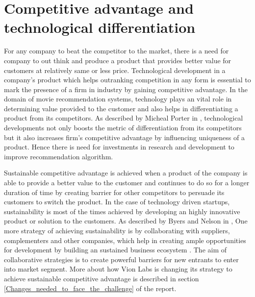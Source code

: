 \section{Competitive advantage and technological differentiation}
\label{Competitive_advantage_tech_differentiation}
 For any company to beat the competitor to the market, there is a need for company to out think and produce a product that provides better value for customers at relatively same or less price. Technological development in a company's product which helps outranking competition in any form is essential to mark the presence of a firm in industry by gaining competitive advantage. In the domain of movie recommendation systems, technology plays an vital role in determining value provided to the customer and also helps in differentiating a product from its competitors. As described by Micheal Porter in \citep{Porter199806}, technological developments not only boosts the metric of differentiation from its competitors but it also increases firm's competitive advantage by influencing uniqueness of a product. Hence there is need for investments in research and development to improve recommendation algorithm. 

 Sustainable competitive advantage is achieved when a product of the company is able to provide a better value to the customer and continues to do so for a longer duration of time by creating barrier for other competitors to persuade its customers to switch the product. In the case of technology driven startups, sustainability is most of the times achieved by developing an highly innovative product or solution to the customers. As described by Byers and Nelson in \citep{ByersDorfNelson201401}, One more strategy of achieving sustainability is by collaborating with suppliers, complementers and other companies, which help in creating ample opportunities for development by building an sustained business ecosystem . The aim of collaborative strategies is to create powerful barriers for new entrants to enter into market segment. More about how Vion Labs is changing its strategy to achieve sustainable competitive advantage is described in section \ref{Changes_needed_to_face_the_challenge} of the report.  

